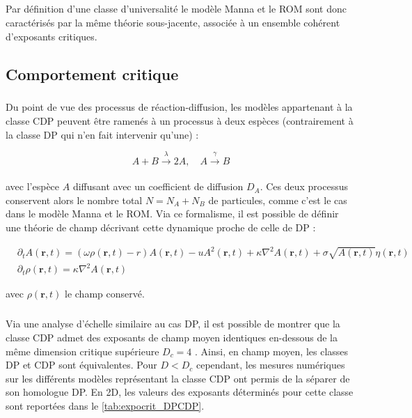 \subparagraph{}Par définition d'une classe d'universalité le modèle Manna et le ROM sont donc caractérisés par la même théorie sous-jacente, associée à un ensemble cohérent d'exposants critiques.

\subsection{Comportement critique}

\label{sec:CompCDP}

\subparagraph{}Du point de vue des processus de réaction-diffusion, les modèles appartenant à la classe CDP peuvent être ramenés à un processus à deux espèces \cite{van_wijland_wilson_1998, pastor_satorras_reaction_diffusion_2001, pastor_satorras_field_2000} (contrairement à la classe DP qui n'en fait intervenir qu'une) :

\begin{equation}
	A +B \xrightarrow[]{\lambda} 2A, \quad A \xrightarrow[]{\gamma} B
\end{equation}

\noindent avec l'espèce $A$ diffusant avec un coefficient de diffusion $D_A$. Ces deux processus conservent alors le nombre total $N=N_A+N_B$ de particules, comme c'est le cas dans le modèle Manna et le ROM. Via ce formalisme, il est possible de définir une théorie de champ décrivant cette dynamique proche de celle de DP \cite{van_wijland_universality_2002, le_doussal_exact_2015} :

\begin{equation}
\begin{aligned}
	&\partial_t A(\mathbf{r}, t) = (\omega\rho (\mathbf{r}, t) - r)A(\mathbf{r}, t) - uA^2(\mathbf{r}, t) + \kappa\nabla^2 A (\mathbf{r}, t) + \sigma \sqrt{A(\mathbf{r}, t)} \eta(\mathbf{r}, t)\\
	&\partial_t \rho (\mathbf{r}, t) = \kappa\nabla^2 A (\mathbf{r}, t)
\end{aligned}
\label{eq:CDP}
\end{equation}

\noindent avec $\rho(\mathbf{r}, t)$ le champ conservé.

\subparagraph{}Via une analyse d'échelle similaire au cas DP, il est possible de montrer que la classe CDP admet des exposants de champ moyen identiques en-dessous de la même dimension critique supérieure $D_c = 4$ \cite{le_doussal_exact_2015, lubeck_universal_2004}. Ainsi, en champ moyen, les classes DP et CDP sont équivalentes. Pour $D<D_c$ cependant, les mesures numériques sur les différents modèles représentant la classe CDP ont permis de la séparer de son homologue DP. En 2D, les valeurs des exposants déterminés pour cette classe sont reportées dans le \autoref{tab:expocrit_DPCDP}.

